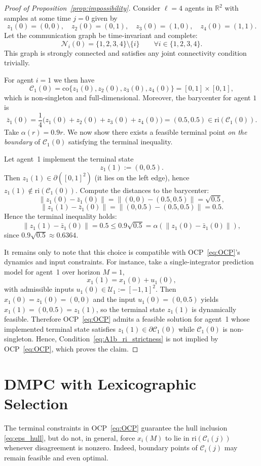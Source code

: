 \documentclass[12pt,draftcls,onecolumn]{IEEEtran}
\def\field#1{\mathbb #1}%
\def\R{\field{R}}%
\newcommand{\U}{\ensuremath{\mathcal U}}
\def\Ni{\mathcal{N}_i}
\def\C{\mathcal{C}}
\def\Cij{\mathcal{C}_i (j)}
\def\ri{\mathrm{ri}}
\def\co{\mathrm{co}}
\begin{document}
\begin{proof}[Proof of Proposition~\ref{prop:impossibility}]
Consider $\ell=4$ agents in $\R^2$ with samples at some time $j=0$ given by
\[
z_1(0)=(0,0),\quad z_2(0)=(0,1),\quad z_3(0)=(1,0),\quad z_4(0)=(1,1).
\]
Let the communication graph be time-invariant and complete:
\[
\Ni(0)=\{1,2,3,4\}\setminus\{i\}\qquad\forall i\in\{1,2,3,4\}.
\]
This graph is strongly connected and satisfies any joint connectivity condition trivially.

For agent $i=1$ we then have
\[
\C_1(0)=\co\{z_1(0),z_2(0),z_3(0),z_4(0)\}=[0,1]\times[0,1],
\]
which is non-singleton and full-dimensional.
Moreover, the barycenter for agent $1$ is
\[
\bar z_1(0)=\frac{1}{4}\bigl(z_1(0)+z_2(0)+z_3(0)+z_4(0)\bigr)=(0.5,0.5)\in \ri(\C_1(0)).
\]
Take $\alpha(r)=0.9r$.
We now show there exists a feasible terminal point \emph{on the boundary} of $\C_1(0)$ satisfying the terminal inequality.

Let agent~1 implement the terminal state
\[
z_1(1):=(0,0.5).
\]
Then $z_1(1)\in\partial([0,1]^2)$ (it lies on the left edge), hence $z_1(1)\notin \ri(\C_1(0))$.
Compute the distances to the barycenter:
\[
\|z_1(0)-\bar z_1(0)\|=\|(0,0)-(0.5,0.5)\|=\sqrt{0.5},
\]
\[
\|z_1(1)-\bar z_1(0)\|=\|(0,0.5)-(0.5,0.5)\|=0.5.
\]
Hence the terminal inequality holds:
\[
\|z_1(1)-\bar z_1(0)\| = 0.5 \le 0.9\sqrt{0.5}=\alpha(\|z_1(0)-\bar z_1(0)\|),
\]
since $0.9\sqrt{0.5}\approx 0.6364$.

It remains only to note that this choice is compatible with OCP~\eqref{eq:OCP}'s dynamics and input constraints.
For instance, take a single-integrator prediction model for agent~1 over horizon
$M=1$,
\[
x_1(1)=x_1(0)+u_1(0),
\]
with admissible inputs $u_1(0)\in \U_1:=[-1,1]^2$.
Then $x_1(0)=z_1(0)=(0,0)$ and the input $u_1(0)=(0,0.5)$ yields $x_1(1)=(0,0.5)=z_1(1)$,
so the terminal state $z_1(1)$ is dynamically feasible.
Therefore OCP~\eqref{eq:OCP} admits a feasible solution for agent~1 whose implemented terminal
state satisfies
$z_1(1)\in\partial \C_1(0)$ while $\C_1(0)$ is non-singleton.
Hence, Condition~\eqref{eq:A1b_ri_strictness} is not implied by OCP~\eqref{eq:OCP}, which proves the claim.
\end{proof}
\section{DMPC with Lexicographic Selection}\label{sec:OCP_with_lex_sel}
The terminal constraints in OCP~\eqref{eq:OCP} guarantee the hull inclusion \eqref{eq:eps_hull}, but do not,
in general, force $x_i(M)$ to lie in $\ri(\Cij)$ whenever disagreement is
nonzero. 
Indeed, boundary points of $\Cij$ may remain feasible and even optimal.
\end{document}
